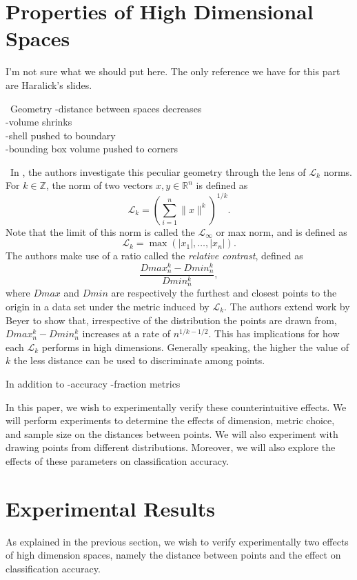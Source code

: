 \documentclass{article}
\newcommand{\Z}{\mathbb{Z}}
\newcommand{\R}{\mathbb{R}}
\begin{document}
\section{Properties of High Dimensional Spaces}
I'm not sure what we should put here. The only reference we have for this part are Haralick's slides.

\
Geometry
-distance between spaces decreases\\
-volume shrinks\\
-shell pushed to boundary\\
-bounding box volume pushed to corners

\
In \cite{aggarwal2001surprising}, the authors investigate this peculiar geometry through the lens of $\mathcal{L}_k$ norms. For $k\in\Z$, the norm of two vectors $x,y\in\R^n$ is defined as
$$
\mathcal{L}_k=\left(\sum_{i=1}^n\|x\|^k\right)^{1/k}.
$$
Note that the limit of this norm is called the $\mathcal{L}_{\infty}$ or max norm, and is defined as
$$
\mathcal{L}_k=\max(|x_1|,\ldots,|x_n|).
$$
The authors make use of a ratio called the \emph{relative contrast}, defined as
$$
\dfrac{Dmax_n^k-Dmin_n^k}{Dmin_n^k},
$$
where $Dmax$ and $Dmin$ are respectively the furthest and closest points to the origin in a data set under the metric induced by $\mathcal{L}_k$. The authors extend work by Beyer\cite{beyer1999nearest} to show that, irrespective of the distribution the points are drawn from, $Dmax_n^k-Dmin_n^k$ increases at a rate of $n^{1/k-1/2}$. This has implications for how each  $\mathcal{L}_k$ performs in high dimensions. Generally speaking, the higher the value of $k$ the less distance can be used to discriminate among points.
\

In addition to 
-accuracy
-fraction metrics
\

In this paper, we wish to experimentally verify these counterintuitive effects. We will perform experiments to determine the effects of dimension, metric choice, and sample size on the distances between points. We will also experiment with drawing points from different distributions. Moreover, we will also explore the effects of these parameters on classification accuracy. 
\section{Experimental Results}
As explained in the previous section, we wish to verify experimentally two effects of high dimension spaces, namely the distance between points and the effect on classification accuracy. 
\end{document}
